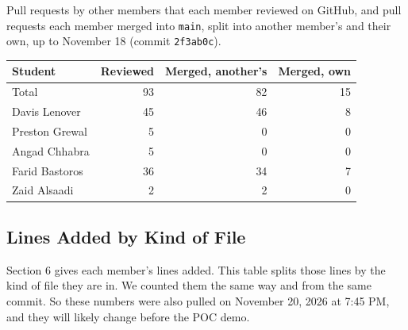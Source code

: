 \documentclass{article}
\begin{document}
Pull requests by other members that each member reviewed on GitHub, and pull
requests each member merged into \texttt{main}, split into another member's
and their own, up to November 18 (commit \texttt{2f3ab0c}).

\begin{table}[H]
\centering
\begin{tabular}{lrrr}
\toprule
\textbf{Student} & \textbf{Reviewed} & \textbf{Merged, another's} &
\textbf{Merged, own}\\
\midrule
Total & 93 & 82 & 15\\
Davis Lenover & 45 & 46 & 8\\
Preston Grewal & 5 & 0 & 0\\
Angad Chhabra & 5 & 0 & 0\\
Farid Bastoros & 36 & 34 & 7\\
Zaid Alsaadi & 2 & 2 & 0\\
\bottomrule
\end{tabular}
\end{table}

\subsection{Lines Added by Kind of File} \label{SecLinesByKind}

Section 6 gives each member's lines added. This table splits those lines by
the kind of file they are in. We counted them the same way and from the same
commit. So these numbers were also pulled on November 20, 2026 at 7:45 PM, and
they will likely change before the POC demo.
\end{document}

